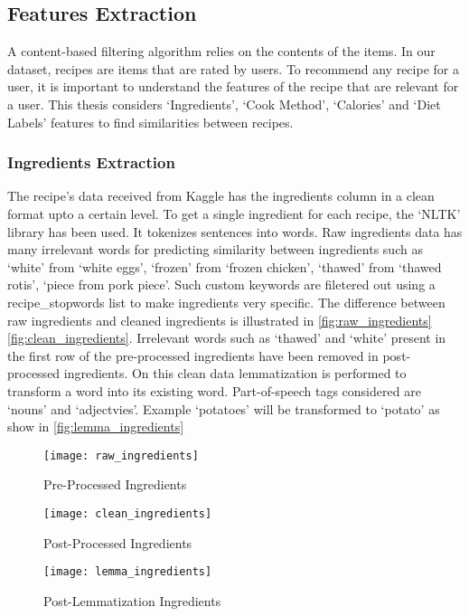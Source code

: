 \subsection{Features Extraction}
A content-based filtering algorithm relies on the contents of the items. In our dataset, recipes are items that are rated by users. To recommend any recipe for a user, it is important to understand the features of the recipe that are relevant for a user. This thesis considers  `Ingredients', `Cook Method', `Calories' and `Diet Labels' features to find similarities between recipes.

\subsubsection{Ingredients Extraction}
The recipe's data received from Kaggle has the ingredients column in a clean format upto a certain level. To get a single ingredient for each recipe, the `NLTK' library has been used. It tokenizes sentences into words. Raw ingredients data has many irrelevant words for predicting similarity between ingredients such as `white' from `white eggs', `frozen' from `frozen chicken', `thawed' from `thawed rotis', `piece from pork piece'. Such custom keywords are filetered out using a recipe\_stopwords list to make ingredients very specific. The difference between raw ingredients and cleaned ingredients is illustrated in \autoref{fig:raw_ingredients} \autoref{fig:clean_ingredients}. Irrelevant words such as `thawed' and `white' present in the first row of the pre-processed ingredients have been removed in post-processed ingredients. On this clean data lemmatization is performed to transform a word into its existing word. Part-of-speech tags considered are `nouns' and `adjectvies'. Example `potatoes' will be transformed to `potato' as show in \autoref{fig:lemma_ingredients}

\begin{singlespace}
\begin{figure}[H]
	\centering
	\texttt{[image: raw\_ingredients]}
	\caption{Pre-Processed Ingredients }
	\label{fig:raw_ingredients}
\end{figure}  
\end{singlespace}
\begin{singlespace}
\begin{figure}[H]
	\centering
	\texttt{[image: clean\_ingredients]}
	\caption{Post-Processed Ingredients }
	\label{fig:clean_ingredients}
\end{figure}  
\end{singlespace}
\begin{singlespace}
\begin{figure}[H]
	\centering
	\texttt{[image: lemma\_ingredients]}
	\caption{Post-Lemmatization Ingredients }
	\label{fig:lemma_ingredients}
\end{figure}  
\end{singlespace}

